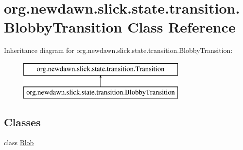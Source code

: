 \hypertarget{classorg_1_1newdawn_1_1slick_1_1state_1_1transition_1_1_blobby_transition}{}\section{org.\+newdawn.\+slick.\+state.\+transition.\+Blobby\+Transition Class Reference}
\label{classorg_1_1newdawn_1_1slick_1_1state_1_1transition_1_1_blobby_transition}
Inheritance diagram for org.\+newdawn.\+slick.\+state.\+transition.\+Blobby\+Transition\+:\begin{figure}[H]
\begin{center}
\leavevmode
\includegraphics[height=2.000000cm]{classorg_1_1newdawn_1_1slick_1_1state_1_1transition_1_1_blobby_transition}
\end{center}
\end{figure}
\subsection*{Classes}
\begin{DoxyCompactItemize}
\item 
class \mbox{\hyperlink{classorg_1_1newdawn_1_1slick_1_1state_1_1transition_1_1_blobby_transition_1_1_blob}{Blob}}
\end{DoxyCompactItemize}
